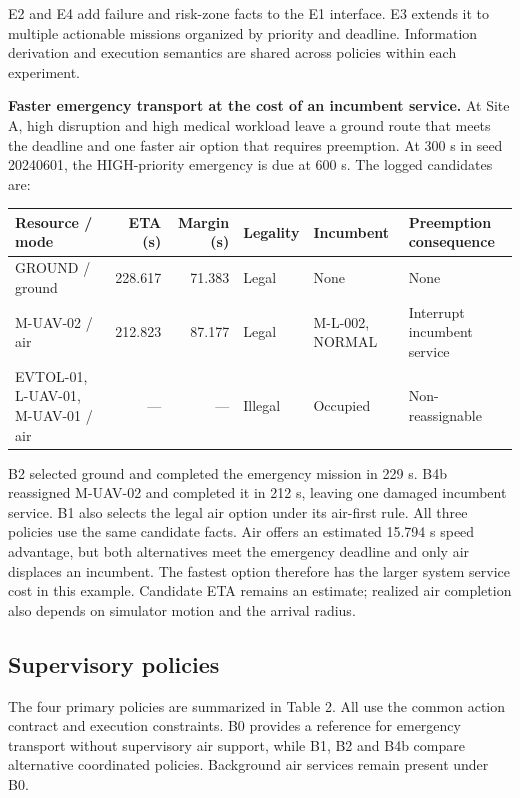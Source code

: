 \documentclass[]{interact}
\theoremstyle{plain}
\theoremstyle{definition}
\theoremstyle{remark}
\begin{document}
E2 and E4 add failure and risk-zone facts to the E1 interface. E3 extends it to multiple actionable missions organized by priority and deadline. Information derivation and execution semantics are shared across policies within each experiment.

\noindent\textbf{Faster emergency transport at the cost of an incumbent service.} At Site A, high disruption and high medical workload leave a ground route that meets the deadline and one faster air option that requires preemption. At 300 s in seed 20240601, the HIGH-priority emergency is due at 600 s. The logged candidates are:

\begin{center}\small
\begin{tabularx}{\textwidth}{@{}YrrYYY@{}}\toprule
Resource / mode & ETA (s) & Margin (s) & Legality & Incumbent & Preemption consequence \\\midrule
GROUND / ground & 228.617 & 71.383 & Legal & None & None \\
M-UAV-02 / air & 212.823 & 87.177 & Legal & M-L-002, NORMAL & Interrupt incumbent service \\
EVTOL-01, L-UAV-01, M-UAV-01 / air & --- & --- & Illegal & Occupied & Non-reassignable \\\bottomrule
\end{tabularx}
\end{center}

B2 selected ground and completed the emergency mission in 229 s. B4b reassigned M-UAV-02 and completed it in 212 s, leaving one damaged incumbent service. B1 also selects the legal air option under its air-first rule. All three policies use the same candidate facts. Air offers an estimated 15.794 s speed advantage, but both alternatives meet the emergency deadline and only air displaces an incumbent. The fastest option therefore has the larger system service cost in this example. Candidate ETA remains an estimate; realized air completion also depends on simulator motion and the arrival radius.

\subsection{Supervisory policies}

The four primary policies are summarized in Table 2. All use the common action contract and execution constraints. B0 provides a reference for emergency transport without supervisory air support, while B1, B2 and B4b compare alternative coordinated policies. Background air services remain present under B0.
\end{document}
